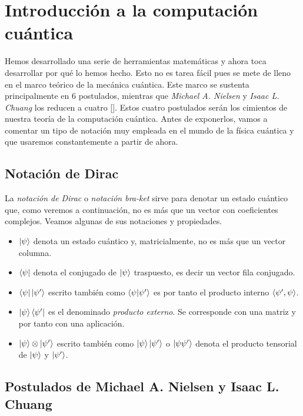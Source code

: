 \chapter{Introducción a la computación cuántica}

Hemos desarrollado una serie de herramientas matemáticas y ahora toca desarrollar por qué lo hemos hecho. Esto no es tarea fácil pues se mete de lleno en el marco teórico de la mecánica cuántica. Este marco se sustenta principalmente en 6 postulados, mientras que \textit{Michael A. Nielsen} y \textit{Isaac L. Chuang} los reducen a cuatro [\cite{nielsen2001quantum}]. Estos cuatro postulados serán los cimientos de nuestra teoría de la computación cuántica. Antes de exponerlos, vamos a comentar un tipo de notación muy empleada en el mundo de la física cuántica y que usaremos constantemente a partir de ahora.

\section{Notación de Dirac}

La \textit{notación de Dirac} o \textit{notación bra-ket} sirve para denotar un estado cuántico que, como veremos a continuación, no es más que un vector con coeficientes complejos. Veamos algunas de sus notaciones y propiedades.
\begin{itemize}
\item $\left|\psi\right\rangle$ denota un estado cuántico y, matricialmente, no es más que un vector columna.
\item $\left\langle\psi\right|$ denota el conjugado de $\left|\psi\right\rangle$ traspuesto, es decir un vector fila conjugado.
\item $\left\langle\psi\right|\left|\psi'\right\rangle$ escrito también como $\left\langle\psi|\psi'\right\rangle$ es por tanto el producto interno $\langle\psi',\psi\rangle$.

\item $\left|\psi\right\rangle\left\langle\psi'\right|$ es el denominado \textit{producto externo}. Se corresponde con una matriz y por tanto con una aplicación.

\item $\left|\psi\right\rangle\otimes\left|\psi'\right\rangle$ escrito también como $\left|\psi\right\rangle\left|\psi'\right\rangle$ o $\left|\psi\psi'\right\rangle$ denota el producto tensorial de $\left|\psi\right\rangle$ y $\left|\psi'\right\rangle$.
\end{itemize}

\section{Postulados de Michael A. Nielsen y Isaac L. Chuang}

